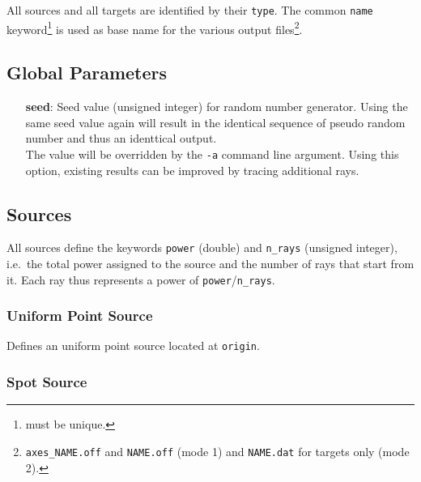 \documentclass[10pt,a4paper,titlepage]{article}
\begin{document}
All sources and all targets are identified by their {\tt type}. The common {\tt name} keyword\footnote{must be unique.} is used as base name for the various output files\footnote{{\tt axes\_NAME.off} and {\tt NAME.off} (mode 1) and {\tt NAME.dat} for targets only (mode 2).}.

\subsection{Global Parameters}
\begin{itemize}
\item[{\bf seed}:]{Seed value (unsigned integer) for random number generator. Using the same seed value again will result in the identical sequence of pseudo random number and thus an identtical output.\\
The value will be overridden by the {\tt -a} command line argument. Using this option, existing results can be improved by tracing additional rays.}
\end{itemize}



\subsection{Sources}

All sources define the keywords {\tt power} (double) and {\tt n\_rays} (unsigned integer), i.e.~the total power assigned to the source and the number of rays that start from it. Each ray thus represents a power of {\tt power}/{\tt n\_rays}.

\subsubsection{Uniform Point Source}






Defines an uniform point source located at {\tt origin}.


\subsubsection{Spot Source}

\end{document}

